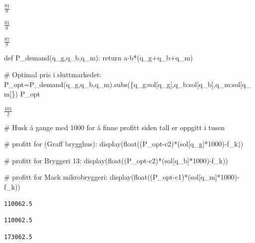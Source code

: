 \documentclass[
  12pt,
  a4paper,
  DIV=11,
  numbers=noendperiod]{scrartcl}
\newenvironment{Shaded}{\begin{snugshade}}{\end{snugshade}}
\newcommand{\BuiltInTok}[1]{\textcolor[rgb]{0.00,0.23,0.31}{#1}}
\newcommand{\CommentTok}[1]{\textcolor[rgb]{0.37,0.37,0.37}{#1}}
\newcommand{\ControlFlowTok}[1]{\textcolor[rgb]{0.00,0.23,0.31}{#1}}
\newcommand{\DecValTok}[1]{\textcolor[rgb]{0.68,0.00,0.00}{#1}}
\newcommand{\KeywordTok}[1]{\textcolor[rgb]{0.00,0.23,0.31}{#1}}
\newcommand{\NormalTok}[1]{\textcolor[rgb]{0.00,0.23,0.31}{#1}}
\newcommand{\OperatorTok}[1]{\textcolor[rgb]{0.37,0.37,0.37}{#1}}
\begin{document}
$\displaystyle \frac{81}{8}$

$\displaystyle \frac{81}{8}$

$\displaystyle \frac{87}{8}$

\begin{Shaded}
\begin{Highlighting}[]
\KeywordTok{def}\NormalTok{ P\_demand(q\_g,q\_b,q\_m):}
    \ControlFlowTok{return}\NormalTok{ a}\OperatorTok{{-}}\NormalTok{b}\OperatorTok{*}\NormalTok{(q\_g}\OperatorTok{+}\NormalTok{q\_b}\OperatorTok{+}\NormalTok{q\_m)}

\CommentTok{\# Optimal pris i sluttmarkedet:}
\NormalTok{P\_opt}\OperatorTok{=}\NormalTok{P\_demand(q\_g,q\_b,q\_m).subs(\{q\_g:sol[q\_g],q\_b:sol[q\_b],q\_m:sol[q\_m]\})}
\NormalTok{P\_opt}
\end{Highlighting}
\end{Shaded}

$\displaystyle \frac{101}{2}$

\begin{Shaded}
\begin{Highlighting}[]
\CommentTok{\# Husk å gange med 1000 for å finne profitt siden tall er oppgitt i tusen}

\CommentTok{\# profitt for (Graff brygghus):}
\NormalTok{display(}\BuiltInTok{float}\NormalTok{((P\_opt}\OperatorTok{{-}}\NormalTok{c2)}\OperatorTok{*}\NormalTok{(sol[q\_g]}\OperatorTok{*}\DecValTok{1000}\NormalTok{)}\OperatorTok{{-}}\NormalTok{f\_k))}

\CommentTok{\# profitt for Bryggeri 13:}
\NormalTok{display(}\BuiltInTok{float}\NormalTok{((P\_opt}\OperatorTok{{-}}\NormalTok{c2)}\OperatorTok{*}\NormalTok{(sol[q\_b]}\OperatorTok{*}\DecValTok{1000}\NormalTok{)}\OperatorTok{{-}}\NormalTok{f\_k))}

\CommentTok{\# profitt for Mack mikrobryggeri:}
\NormalTok{display(}\BuiltInTok{float}\NormalTok{((P\_opt}\OperatorTok{{-}}\NormalTok{c1)}\OperatorTok{*}\NormalTok{(sol[q\_m]}\OperatorTok{*}\DecValTok{1000}\NormalTok{)}\OperatorTok{{-}}\NormalTok{f\_k))}
\end{Highlighting}
\end{Shaded}

\begin{verbatim}
110062.5
\end{verbatim}

\begin{verbatim}
110062.5
\end{verbatim}

\begin{verbatim}
173062.5
\end{verbatim}
\end{document}
